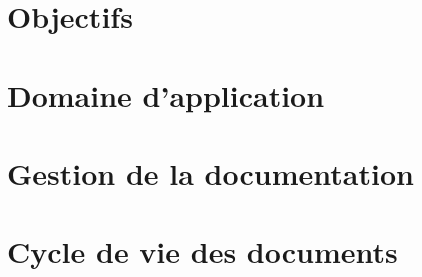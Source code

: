 

\newcommand{\mainTitle}{\'Etude préalable - SPIE}
\newcommand{\secondTitle}{Plan Assurance Qualité}
\newcommand{\documentRef}{PAQ/4401/1}




\listoftodos
\newpage
{}
\tableofcontents
{}
\listoffigures
{}
\listoftables
\newpage


\part{Objectifs}
\setcounter{section}{0}

\part{Domaine d’application}
\setcounter{section}{0}

\part{Gestion de la documentation}
\setcounter{section}{0}

\part{Cycle de vie des documents}
\setcounter{section}{0}

